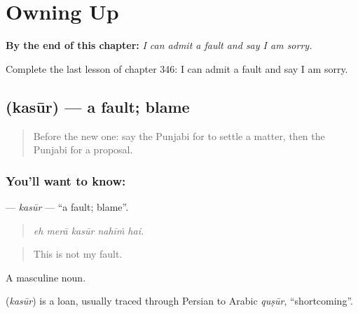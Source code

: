 
\chapter{Owning Up}
\label{ch:pa-a2-owning-up}

\begin{chapteropening}
\textbf{By the end of this chapter:} \emph{I can admit a fault and say I am sorry.}

Complete the last lesson of chapter 346: I can admit a fault and say I am sorry.
\end{chapteropening}

\section[\texorpdfstring{\pa{ਕਸੂਰ} (kasūr)}{ਕਸੂਰ (kasūr)}]{ (kasūr) — a fault; blame}

\label{lesson:PA-C346-kasur}



\begin{quote}
Before the new one: say the Punjabi for to settle a matter, then the Punjabi for a proposal.
\end{quote}

\subsection*{You'll want to know: }
\textbf{} — \emph{kasūr} — \textquotedblleft{}a fault; blame\textquotedblright{}.

\begin{quote}
    
\end{quote}

\begin{quote}
\emph{eh merā kasūr nahīṁ hai.}
\end{quote}

\begin{quote}
This is not my fault.
\end{quote}

A masculine noun.

\begin{cousinweb}
\textbf{} (\emph{kasūr}) is a loan, usually traced through Persian to Arabic \emph{quṣūr}, \textquotedblleft{}shortcoming\textquotedblright{}.
\end{cousinweb}

